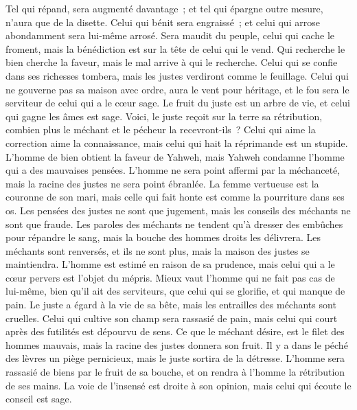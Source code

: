 \begin{multicols}{2}
Tel qui répand, sera augmenté davantage~; et tel qui épargne outre mesure, n'aura que de la disette.
Celui qui bénit sera engraissé~; et celui qui arrose abondamment sera lui-même arrosé.
Sera maudit du peuple, celui qui cache le froment, mais la bénédiction est sur la tête de celui qui le vend.
Qui recherche le bien cherche la faveur, mais le mal arrive à qui le recherche.
Celui qui se confie dans ses richesses tombera, mais les justes verdiront comme le feuillage.
Celui qui ne gouverne pas sa maison avec ordre, aura le vent pour héritage, et le fou sera le serviteur de celui qui a le cœur sage.
Le fruit du juste est un arbre de vie, et celui qui gagne les âmes est sage.
Voici, le juste reçoit sur la terre sa rétribution, combien plus le méchant et le pécheur la recevront-ils~?
\VerseOne{}Celui qui aime la correction aime la connaissance, mais celui qui hait la réprimande est un stupide.
L'homme de bien obtient la faveur de Yahweh, mais Yahweh condamne l'homme qui a des mauvaises pensées.
L'homme ne sera point affermi par la méchanceté, mais la racine des justes ne sera point ébranlée.
La femme vertueuse est la couronne de son mari, mais celle qui fait honte est comme la pourriture dans ses os.
Les pensées des justes ne sont que jugement, mais les conseils des méchants ne sont que fraude.
Les paroles des méchants ne tendent qu'à dresser des embûches pour répandre le sang, mais la bouche des hommes droits les délivrera.
Les méchants sont renversés, et ils ne sont plus, mais la maison des justes se maintiendra.
L'homme est estimé en raison de sa prudence, mais celui qui a le cœur pervers est l'objet du mépris.
Mieux vaut l'homme qui ne fait pas cas de lui-même, bien qu'il ait des serviteurs, que celui qui se glorifie, et qui manque de pain.
Le juste a égard à la vie de sa bête, mais les entrailles des méchants sont cruelles.
Celui qui cultive son champ sera rassasié de pain, mais celui qui court après des futilités est dépourvu de sens.
Ce que le méchant désire, est le filet des hommes mauvais, mais la racine des justes donnera son fruit.
Il y a dans le péché des lèvres un piège pernicieux, mais le juste sortira de la détresse.
L'homme sera rassasié de biens par le fruit de sa bouche, et on rendra à l'homme la rétribution de ses mains.
La voie de l'insensé est droite à son opinion, mais celui qui écoute le conseil est sage.

\end{multicols}
